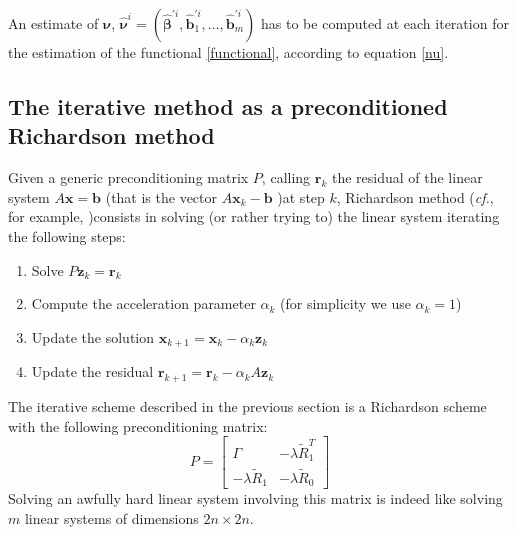 An estimate of $\bm{\nu}$, $\hat{\bm{\nu}}^i = (\hat{\bm{\beta}}^{\prime i}, \hat{\bm{b}}_1^{\prime i}, \dots, \hat{\bm{b}}_m^{\prime i})$ has to be computed at each iteration for the estimation of the functional \ref{functional}, according to equation \ref{nu}.

\subsection{The iterative method as a preconditioned Richardson method}
Given a generic preconditioning matrix $P$, calling $\bm{r}_k$ the residual of the linear system $A \bm{x} = \bm{b}$ (that is the vector $A \bm{x}_k - \bm{b}$ )at step $k$,
Richardson method (\textit{cf.}, for example, \cite{Quarteroni})consists in solving (or rather trying to) the linear system iterating the following steps:
\begin{enumerate}
    \item Solve $P \bm{z}_k = \bm{r}_k$
    \item Compute the acceleration parameter $\alpha_k$ (for simplicity we use $\alpha_k = 1$)
    \item Update the solution $ \bm{x}_{k+1} = \bm{x}_{k} - \alpha_k \bm{z}_k $
    \item Update the residual $\bm{r}_{k+1} = \bm{r}_{k} - \alpha_k A \bm{z}_k$
\end{enumerate}

The iterative scheme described in the previous section is a Richardson scheme with the following preconditioning matrix:
\begin{equation}
    \label{precond}
    P=
    \begin{bmatrix}
        \Gamma & -\lambda \tilde{R}_1^T\\
        -\lambda \tilde{R}_1  & -\lambda \tilde{R}_0
    \end{bmatrix}
\end{equation}
Solving an awfully hard linear system involving this matrix is indeed like solving $m$ linear systems of dimensions $2n\times 2n$.
